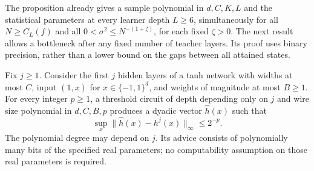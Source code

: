 The proposition already gives a sample polynomial in $d,C,K,L$ and the
statistical parameters at every learner depth $L\ge6$, simultaneously
for all $N\ge C_L(f)$ and all
$0<\sigma^2\le N^{-(1+\zeta)}$, for each fixed $\zeta>0$.
The next result allows a bottleneck after any fixed number of teacher
layers. Its proof uses binary precision, rather than a lower bound on
the gaps between all attained states.

\begin{lemma}
\label{lem:fixed-prefix-tc-evaluation}
Fix $j\ge1$. Consider the first $j$ hidden layers of a tanh network
with widths at most $C$, input $(1,x)$ for $x\in\{-1,1\}^d$, and
weights of magnitude at most $B\ge1$. For every integer $p\ge1$, a
threshold circuit of depth depending only on $j$ and wire size
polynomial in $d,C,B,p$ produces a dyadic vector $\widehat h(x)$ such
that
\[
 \sup_x\|\widehat h(x)-h^j(x)\|_\infty\le2^{-p}.
\]
The polynomial degree may depend on $j$. Its advice consists of
polynomially many bits of the specified real parameters; no
computability assumption on those real parameters is required.
\end{lemma}

